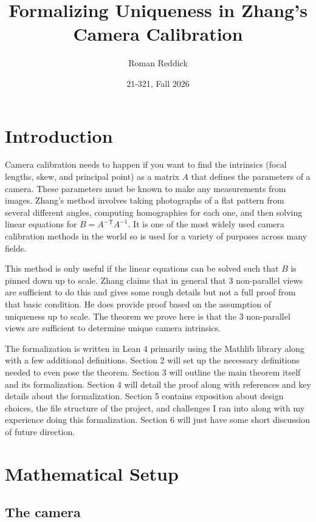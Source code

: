\documentclass[10pt]{article}
\title{Formalizing Uniqueness in Zhang's Camera Calibration}
\author{Roman Reddick}
\date{21-321, Fall 2026}
\theoremstyle{plain}
\theoremstyle{definition}
\theoremstyle{remark}
\newcommand{\T}{^{\mathsf{T}}}
\begin{document}
\maketitle

\section{Introduction}

Camera calibration needs to happen if you want to find the intrinsics (focal lengths, skew, and principal point) as a matrix $A$ that defines the parameters of a camera. These parameters must be known to make any measurements from images. Zhang's method involves taking photographs of a flat pattern from several different angles, computing homographies for each one, and then solving linear equations for $B=A^{-}{\T} A^{-1}$. It is one of the most widely used camera calibration methods in the world so is used for a variety of purposes across many fields.

This method is only useful if the linear equations can be solved such that $B$ is pinned down up to scale. Zhang claims that in general that 3 non-parallel views are sufficient to do this and gives some rough details but not a full proof from that basic condition. He does provide proof based on the assumption of uniqueness up to scale. The theorem we prove here is that the 3 non-parallel views are sufficient to determine unique camera intrinsics.

The formalization is written in Lean 4 primarily using the Mathlib library along with a few additional definitions. Section 2 will set up the necessary definitions needed to even pose the theorem. Section 3 will outline the main theorem itself and its formalization. Section 4 will detail the proof along with references and key details about the formalization. Section 5 contains exposition about design choices, the file structure of the project, and challenges I ran into along with my experience doing this formalization. Section 6 will just have some short discussion of future direction. 

\section{Mathematical Setup}

\subsection{The camera}
\end{document}
